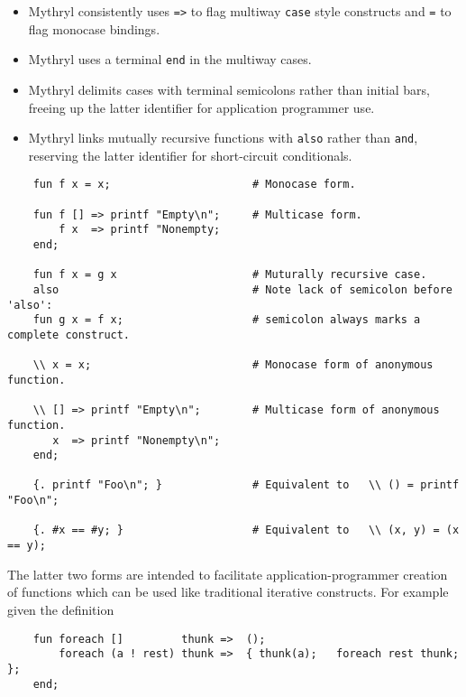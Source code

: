 \begin{itemize}

\item Mythryl consistently uses {\tt =>} to flag multiway {\tt case} 
style constructs and {\tt =} to flag monocase bindings.

\item Mythryl uses a terminal {\tt end} in the multiway cases.

\item Mythryl delimits cases with terminal semicolons rather than initial bars, 
freeing up the latter identifier for application programmer use.

\item Mythryl links mutually recursive functions with {\tt also} rather than 
{\tt and}, reserving the latter identifier for short-circuit conditionals.
\end{itemize}

\begin{verbatim}
    fun f x = x;                      # Monocase form.

    fun f [] => printf "Empty\n";     # Multicase form.
        f x  => printf "Nonempty;
    end;

    fun f x = g x                     # Muturally recursive case.
    also                              # Note lack of semicolon before 'also':
    fun g x = f x;                    # semicolon always marks a complete construct.

    \\ x = x;                         # Monocase form of anonymous function.

    \\ [] => printf "Empty\n";        # Multicase form of anonymous function.
       x  => printf "Nonempty\n";
    end;

    {. printf "Foo\n"; }              # Equivalent to   \\ () = printf "Foo\n";

    {. #x == #y; }                    # Equivalent to   \\ (x, y) = (x == y);
\end{verbatim}

The latter two forms are intended to facilitate application-programmer 
creation of functions which can be used like traditional iterative 
constructs.  For example given the definition

\begin{verbatim}
    fun foreach []         thunk =>  ();
        foreach (a ! rest) thunk =>  { thunk(a);   foreach rest thunk; };
    end;
\end{verbatim}

